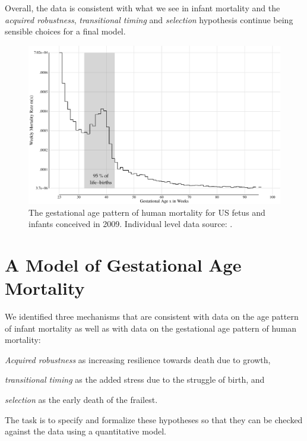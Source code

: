 \documentclass[12pt, parskip=half]{scrartcl}
\begin{document}
Overall, the data is consistent with what we see in infant mortality and the \emph{acquired robustness}, \emph{transitional timing} and \emph{selection} hypothesis continue being sensible choices for a final model.

\begin{figure}[!htb]
  \centering
  \includegraphics[width = \textwidth]{./fig/us_fimort_2009_mx.pdf}
  \caption{The gestational age pattern of human mortality for US fetus and infants conceived in 2009. Individual level data source: \cite{DVS2015}.}
  \label{fig:us_fimort_2009_mx}
\end{figure}

\section{A Model of Gestational Age Mortality} %
\label{sec:modelling_the_gestational_age_pattern_of_human_mortality}

We identified three mechanisms that are consistent with data on the age pattern of infant mortality as well as with data on the gestational age pattern of human mortality:
\begin{inparaenum}
  \item \emph{Acquired robustness} as increasing resilience towards death due to growth,
  \item \emph{transitional timing} as the added stress due to the struggle of birth, and
  \item \emph{selection} as the early death of the frailest.
\end{inparaenum}
The task is to specify and formalize these hypotheses so that they can be checked against the data using a quantitative model.
\end{document}
